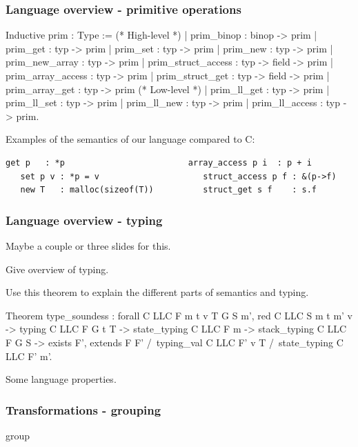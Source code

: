 \begin{frame}[fragile]
\frametitle{Language overview - primitive operations}

\begin{coqs}
Inductive prim : Type :=
  (* High-level *)
  | prim_binop : binop -> prim
  | prim_get : typ -> prim
  | prim_set : typ -> prim
  | prim_new : typ -> prim
  | prim_new_array : typ -> prim
  | prim_struct_access : typ -> field -> prim
  | prim_array_access : typ -> prim
  | prim_struct_get : typ -> field -> prim
  | prim_array_get : typ -> prim
  (* Low-level *)
  | prim_ll_get : typ -> prim
  | prim_ll_set : typ -> prim
  | prim_ll_new : typ -> prim
  | prim_ll_access : typ -> prim.
\end{coqs}

Examples of the semantics of our language compared to C:

\begin{Verbatim}[fontsize=\scriptsize]
   get p   : *p                         array_access p i  : p + i
   set p v : *p = v                     struct_access p f : &(p->f)
   new T   : malloc(sizeof(T))          struct_get s f    : s.f
\end{Verbatim}

\end{frame}


\begin{frame}[fragile]
\frametitle{Language overview - typing}

Maybe a couple or three slides for this.

Give overview of typing.

Use this theorem to explain the different parts of semantics and typing.

\begin{coqs}
Theorem type_soundess : forall C LLC F m t v T G S m',
  red C LLC S m t m' v ->
  typing C LLC F G t T ->
  state_typing C LLC F m ->
  stack_typing C LLC F G S ->
  exists F', extends F F'
    /\  typing_val C LLC F' v T
    /\  state_typing C LLC F' m'.
\end{coqs}

Some language properties.

\end{frame}


\begin{frame}[fragile]
\frametitle{Transformations - grouping}

group

\end{frame}



